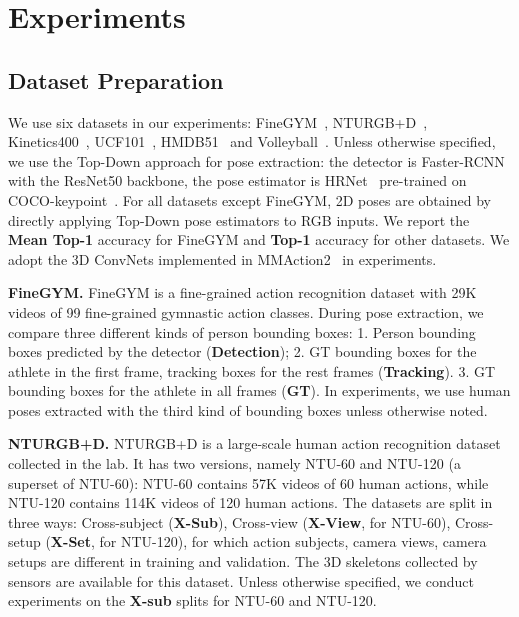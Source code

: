 \section{Experiments}

\subsection{Dataset Preparation}
We use six datasets in our experiments: FineGYM~\cite{shao2020finegym}, NTURGB+D~\cite{Shahroudy_2016_NTURGBD, Liu_2019_NTURGBD120}, 
Kinetics400~\cite{carreira2017quo, yan2018spatial}, UCF101~\cite{soomro2012ucf101}, HMDB51~\cite{kuehne2011hmdb} 
and Volleyball~\cite{ibrahim2016hierarchical}. 
Unless otherwise specified, we use the Top-Down approach for pose extraction:
the detector is Faster-RCNN~\cite{ren2015faster} with the ResNet50 backbone, the pose estimator is 
HRNet~\cite{sun2019deep} pre-trained on COCO-keypoint~\cite{lin2014microsoft}.
For all datasets except FineGYM, 2D poses are obtained by directly applying Top-Down pose estimators to RGB inputs.
We report the \textbf{Mean Top-1} accuracy for FineGYM and \textbf{Top-1} accuracy for other datasets.
We adopt the 3D ConvNets implemented in MMAction2~\cite{2020mmaction2} in experiments. 

\noindent
\textbf{FineGYM. } 
FineGYM is a fine-grained action recognition dataset with 29K videos of 99 fine-grained gymnastic action classes. 
During pose extraction, we compare three different kinds of person bounding boxes: 
1. Person bounding boxes predicted by the detector (\textbf{Detection});
2. GT bounding boxes for the athlete in the first frame, tracking boxes for the rest frames (\textbf{Tracking}).
3. GT bounding boxes for the athlete in all frames (\textbf{GT}).
In experiments, we use human poses extracted with the third kind of bounding boxes unless otherwise noted.

\noindent
\textbf{NTURGB+D. } 
NTURGB+D is a large-scale human action recognition dataset collected in the lab.
It has two versions, namely NTU-60 and NTU-120 (a superset of NTU-60): NTU-60 contains 57K videos of 60 human actions, while NTU-120 contains 114K videos of 120 human actions.
The datasets are split in three ways: 
Cross-subject (\textbf{X-Sub}), Cross-view (\textbf{X-View}, for NTU-60), Cross-setup (\textbf{X-Set}, for NTU-120), 
for which action subjects, camera views, camera setups are different in training and validation.
The 3D skeletons collected by sensors are available for this dataset. 
Unless otherwise specified, we conduct experiments on the \textbf{X-sub} splits for NTU-60 and NTU-120.

